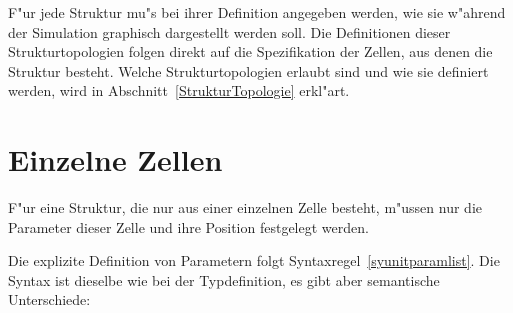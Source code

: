 F"ur jede Struktur mu"s bei
ihrer Definition angegeben werden, wie sie w"ahrend der Simulation
graphisch dargestellt
werden soll. Die Definitionen dieser Strukturtopologien folgen direkt
auf die Spezifikation der Zellen, aus denen die Struktur besteht.
Welche Strukturtopologien erlaubt sind und wie sie definiert werden,
wird in Abschnitt~\ref{StrukturTopologie} erkl"art.



\section{Einzelne Zellen}
\label{unitstruct}

F"ur eine Struktur, die nur aus einer
einzelnen Zelle besteht, m"ussen nur die Parameter dieser Zelle und
ihre Position festgelegt werden.

\begin{center}
\end{center}

Die explizite Definition von Parametern folgt
Syntaxregel~\ref{syunitparamlist}. Die Syntax ist dieselbe wie bei der
Typdefinition, es gibt aber semantische Unterschiede:

